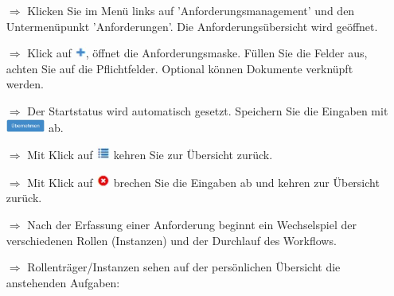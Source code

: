 \documentclass{article}
\begin{document}
\begin{multicols}{2}

\begin{tcolorbox}[colback=blue!5,colframe=blue!40!black,title=Anforderung erfassen]
\begin{itemize}
  \item[$\Longrightarrow$] Klicken Sie im Menü links auf 'Anforderungsmanagement' und den Untermenüpunkt 'Anforderungen'. Die Anforderungsübersicht wird geöffnet.
  \item[$\Longrightarrow$] Klick auf \includegraphics[height=10pt]{Icons/Pluszeichen.jpg}, öffnet die Anforderungsmaske. Füllen Sie die Felder aus, achten Sie auf die Pflichtfelder. Optional können Dokumente verknüpft werden.
  \item[$\Longrightarrow$] Der Startstatus wird automatisch gesetzt. Speichern Sie die Eingaben mit \includegraphics[height=12pt]{Icons/B_Uebernehmen.jpg} ab.
	\item[$\Longrightarrow$] Mit Klick auf \includegraphics[height=12pt]{Icons/Listensymbol_zurueck.jpg} kehren Sie zur Übersicht zurück.
	\item[$\Longrightarrow$] Mit Klick auf \includegraphics[height=12pt]{Icons/Abbrechen_r.jpg} brechen Sie die Eingaben ab und kehren zur Übersicht zurück.
\end{itemize}
\end{tcolorbox}

\begin{tcolorbox}[colback=blue!5,colframe=blue!40!black,title={Anforderungen managen}]
\begin{itemize}
  \item[$\Longrightarrow$] Nach der Erfassung einer Anforderung beginnt ein Wechselspiel der verschiedenen Rollen (Instanzen) und der Durchlauf des Workflows.
  \item[$\Longrightarrow$] Rollenträger/Instanzen sehen auf der persönlichen Übersicht die anstehenden Aufgaben:

\begin{centering}
\end{centering}


\end{itemize}
\end{tcolorbox}
\end{multicols}
\end{document}
